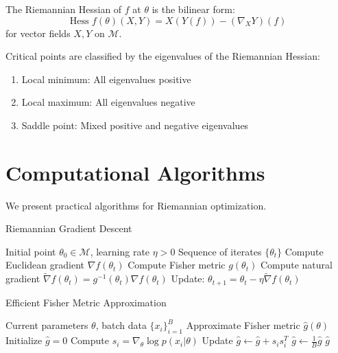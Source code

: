 \begin{definition}
\label{def:riemannian_hessian}
The Riemannian Hessian of $f$ at $\theta$ is the bilinear form:
$$\text{Hess } f(\theta)(X, Y) = X(Y(f)) - (\nabla_X Y)(f)$$
for vector fields $X, Y$ on $\mathcal{M}$.
\end{definition}

\begin{theorem}
\label{thm:critical_point_classification}
Critical points are classified by the eigenvalues of the Riemannian Hessian:
\begin{enumerate}
\item Local minimum: All eigenvalues positive
\item Local maximum: All eigenvalues negative  
\item Saddle point: Mixed positive and negative eigenvalues
\end{enumerate}
\end{theorem}

\section{Computational Algorithms}

We present practical algorithms for Riemannian optimization.

\begin{algorithm}
\caption{Riemannian Gradient Descent}
\begin{algorithmic}[1]
\Require Initial point $\theta_0 \in \mathcal{M}$, learning rate $\eta > 0$
\Ensure Sequence of iterates $\{\theta_t\}$
    \State Compute Euclidean gradient $\nabla f(\theta_t)$
    \State Compute Fisher metric $g(\theta_t)$
    \State Compute natural gradient $\tilde{\nabla} f(\theta_t) = g^{-1}(\theta_t) \nabla f(\theta_t)$
    \State Update: $\theta_{t+1} = \theta_t - \eta \tilde{\nabla} f(\theta_t)$
\EndFor
\end{algorithmic}
\end{algorithm}

\begin{algorithm}
\caption{Efficient Fisher Metric Approximation}
\begin{algorithmic}[1]
\Require Current parameters $\theta$, batch data $\{x_i\}_{i=1}^B$
\Ensure Approximate Fisher metric $\hat{g}(\theta)$
\State Initialize $\hat{g} = 0$
    \State Compute $s_i = \nabla_\theta \log p(x_i|\theta)$
    \State Update $\hat{g} \leftarrow \hat{g} + s_i s_i^T$
\EndFor
\State $\hat{g} \leftarrow \frac{1}{B} \hat{g}$
\State \Return $\hat{g}$
\end{algorithmic}
\end{algorithm}

